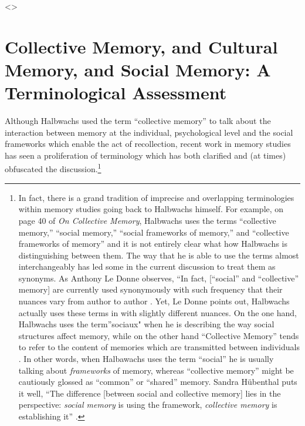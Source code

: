 \textless{}\textgreater{}

\hypertarget{collective-memory-and-cultural-memory-and-social-memory-a-terminological-assessment}{%
\section{Collective Memory, and Cultural Memory, and Social Memory: A
Terminological
Assessment}\label{collective-memory-and-cultural-memory-and-social-memory-a-terminological-assessment}}

Although Halbwachs used the term ``collective memory'' to talk about the
interaction between memory at the individual, psychological level and
the social frameworks which enable the act of recollection, recent work
in memory studies has seen a proliferation of terminology which has both
clarified and (at times) obfuscated the discussion.\footnote{In fact,
  there is a grand tradition of imprecise and overlapping terminologies
  within memory studies going back to Halbwachs himself. For example, on
  page 40 of \emph{On Collective Memory}, Halbwachs uses the terms
  ``collective memory,'' ``social memory,'' ``social frameworks of
  memory,'' and ``collective frameworks of memory'' and it is not
  entirely clear what how Halbwachs is distinguishing between them. The
  way that he is able to use the terms almost interchangeably has led
  some in the current discussion to treat them as synonyms. As Anthony
  Le Donne observes, ``In fact, {[}``social'' and ``collective''
  memory{]} are currently used synonymously with such frequency that
  their nuances vary from author to author \autocite[42
  n.8]{ledonne2009}. Yet, Le Donne points out, Halbwachs actually uses
  these terms in with slightly different nuances. On the one hand,
  Halbwachs uses the term''sociaux" when he is describing the way social
  structures affect memory, while on the other hand ``Collective
  Memory'' tends to refer to the content of memories which are
  transmitted between individuals \autocite[42 n.8]{ledonne2009}. In
  other words, when Halbawachs uses the term ``social'' he is usually
  talking about \emph{frameworks} of memory, whereas ``collective
  memory'' might be cautiously glossed as ``common'' or ``shared''
  memory. Sandra Hübenthal puts it well, ``The difference {[}between
  social and collective memory{]} lies in the perspective: \emph{social
  memory} is using the framework, \emph{collective memory} is
  establishing it'' \autocite[180]{hubenthal_carstens-hasselbalch2012}.}
